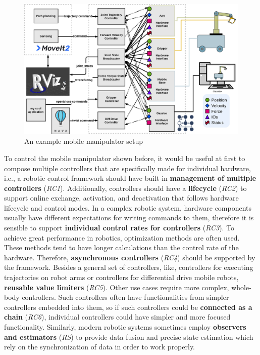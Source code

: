 \documentclass[journal]{IEEEtran}
\begin{document}
\begin{figure}
    \centering
    \includegraphics[width=\columnwidth]{figures/ros2_control_mobile_manipulator_control_arch_independent_hardware}
    \caption{An example mobile manipulator setup}
    \label{fig:ros2c-mobile-manipulator-control-architecture}
\end{figure}

To control the mobile manipulator shown before, it would be useful at first to compose multiple controllers that are specifically made for individual hardware, i.e., a robotic control framework should have built-in \textbf{management of multiple controllers} (\emph{RC1}).
Additionally, controllers should have a \textbf{lifecycle} (\emph{RC2}) to support online exchange, activation, and deactivation that follows hardware lifecycle and control modes.
In a complex robotic system, hardware components usually have different expectations for writing commands to them, therefore it is sensible to support \textbf{individual control rates for controllers} (\emph{RC3}).
To achieve great performance in robotics, optimization methods are often used.
These methods tend to have longer calculations than the control rate of the hardware.
Therefore, \textbf{asynchronous controllers} (\emph{RC4}) should be supported by the framework.
Besides a general set of controllers, like, controllers for executing trajectories on robot arms or controllers for differential drive mobile robots, \textbf{reusable value limiters} (\emph{RC5}).
Other use cases require more complex, whole-body controllers.
Such controllers often have functionalities from simpler controllers embedded into them, so if such controllers could be \textbf{connected as a chain} (\emph{RC6}), individual controllers could have simpler and more focused functionality.
Similarly, modern robotic systems sometimes employ \textbf{observers and estimators} (\emph{RS}) to provide data fusion and precise state estimation which rely on the synchronization of data in order to work properly.
\end{document}

